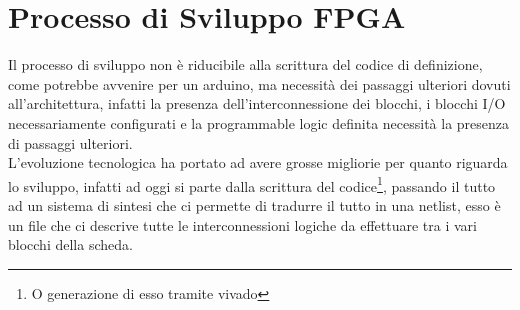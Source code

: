 \section{Processo di Sviluppo FPGA}
Il processo di sviluppo non è riducibile alla scrittura del codice di definizione, come potrebbe avvenire per un arduino, ma necessità dei passaggi ulteriori dovuti all'architettura, infatti la presenza dell'interconnessione dei blocchi, i blocchi I/O necessariamente configurati e la programmable logic definita necessità la presenza di passaggi ulteriori.\\
L'evoluzione tecnologica ha portato ad avere grosse migliorie per quanto riguarda lo sviluppo, infatti ad oggi si parte dalla scrittura del codice\footnote{O generazione di esso tramite vivado}, passando il tutto ad un sistema di sintesi che ci permette di tradurre il tutto in una netlist, esso è un file che ci descrive tutte le interconnessioni logiche da effettuare tra i vari blocchi della scheda.\\

